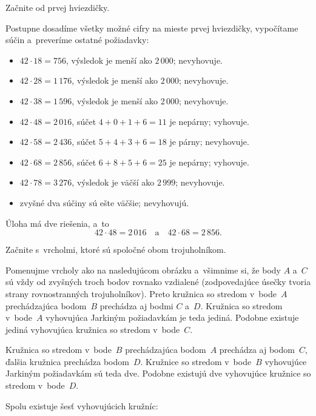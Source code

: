{%
\napad
Začnite od prvej hviezdičky.

\bgroup
\let\times=\cdot

\riesenie
Postupne dosadíme všetky možné cifry na mieste prvej hviezdičky, vypočítame súčin a~preveríme ostatné požiadavky:
\begin{itemize}
\item $42\times 18=756$, výsledok je menší ako $2\,000$; nevyhovuje.
\item $42\times 28=1\,176$, výsledok je menší ako $2\,000$; nevyhovuje.
\item $42\times 38=1\,596$, výsledok je menší ako $2\,000$; nevyhovuje.
\item $42\times 48=2\,016$, súčet $4+0+1+6=11$ je nepárny; vyhovuje.
\item $42\times 58=2\,436$, súčet $5+4+3+6=18$ je párny; nevyhovuje.
\item $42\times 68=2\,856$, súčet $6+8+5+6=25$ je nepárny; vyhovuje.
\item $42\times 78=3\,276$, výsledok je väčší ako $2\,999$; nevyhovuje.
\item zvyšné dva súčiny sú ešte väčšie; nevyhovujú.
\end{itemize}

Úloha má dve riešenia, a~to
$$
42\times 48=2\,016
\quad\text{a}\quad
42\times 68=2\,856.
$$
\egroup
}

{%
\napad
Začnite s~vrcholmi, ktoré sú spoločné obom trojuholníkom.

\riesenie
Pomenujme vrcholy ako na nasledujúcom obrázku a~všimnime si, že body $A$ a~$C$ sú vždy od zvyšných troch bodov rovnako vzdialené (zodpovedajúce úsečky tvoria strany rovnostranných trojuholníkov).
Preto kružnica so stredom v~bode~$A$ prechádzajúca bodom~$B$ prechádza aj bodmi $C$ a~$D$.
Kružnica so stredom v~bode~$A$ vyhovujúca Jarkiným požiadavkám je teda jediná.
Podobne existuje jediná vyhovujúca kružnica so stredom v~bode~$C$.

Kružnica so stredom v~bode~$B$ prechádzajúca bodom~$A$ prechádza aj bodom~$C$, ďalšia kružnica prechádza bodom~$D$.
Kružnice so stredom v~bode~$B$ vyhovujúce Jarkiným požiadavkám sú teda dve.
Podobne existujú dve vyhovujúce kružnice so stredom v~bode~$D$.

Spolu existuje šesť vyhovujúcich kružníc:
%


}


